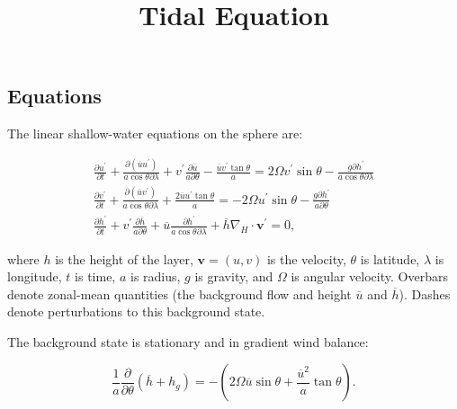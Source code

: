 \documentclass[12pt]{article}
\begin{document}
\title{ \Large Tidal Equation}

\date{}

\maketitle

\vspace*{-1cm}

\subsection*{Equations}

The linear shallow-water equations on the sphere are:

\begin{equation}
  \begin{aligned}
    {\frac{\partial u^{\prime}}{\partial t}+\frac{\partial\left(\overline{u} u^{\prime}\right)}{a \cos \theta \partial \lambda}+v^{\prime} \frac{\partial \overline{u}}{a \partial \theta}-\frac{\overline{u} v^{\prime} \tan \theta}{a}=2 \Omega v^{\prime} \sin \theta-\frac{g \partial h^{\prime}}{a \cos \theta \partial \lambda}} \\
     {\frac{\partial v^{\prime}}{\partial t}+\frac{\partial\left(\overline{u} v^{\prime}\right)}{a \cos \theta \partial \lambda}+\frac{2 \overline{u} u^{\prime} \tan \theta}{a}=-2 \Omega u^{\prime} \sin \theta-\frac{g \partial h^{\prime}}{a \partial \theta}} \\
     {\frac{\partial h^{\prime}}{\partial t}+v^{\prime} \frac{\partial \overline{h}}{a \partial \theta}+\overline{u} \frac{\partial h^{\prime}}{a \cos \theta \partial \lambda}+\overline{h} \nabla_{H} \cdot \mathbf{v}^{\prime}=0},
  \end{aligned}
\end{equation}

where $h$ is the height of the layer, $\boldsymbol{v} = (u,v)$ is the velocity, $\theta$ is latitude, $\lambda$ is longitude, $t$ is time, $a$ is radius, $g$ is gravity, and $\Omega$ is angular velocity. Overbars denote zonal-mean quantities (the background flow and height $\overline{u}$ and $\overline{h}$). Dashes denote perturbations to this background state.

The background state is stationary and in gradient wind balance:

\begin{equation}
  \frac{1}{a} \frac{\partial}{\partial \theta}\left(\overline{h}+h_{g}\right)=-\left(2 \Omega \overline{u} \sin \theta+\frac{\overline{u}^{2}}{a} \tan \theta\right).
\end{equation}
\end{document}
